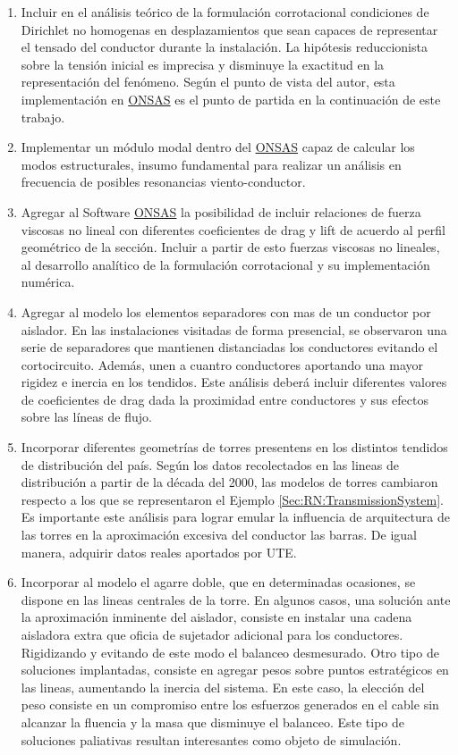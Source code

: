 \begin{enumerate}
	\item Incluir en el análisis teórico de la formulación corrotacional condiciones de Dirichlet no homogenas en desplazamientos que sean capaces de  representar el tensado del conductor durante la instalación. La hipótesis reduccionista sobre la tensión inicial es imprecisa y disminuye la exactitud en la representación del fenómeno. Según el punto de vista del autor, esta implementación en \href{https://github.com/ONSAS/ONSAS/}{ONSAS} es el punto de partida en la continuación de este trabajo. 
	\item Implementar un módulo modal dentro del \href{https://github.com/ONSAS/ONSAS/}{ONSAS} capaz de calcular los modos estructurales, insumo fundamental para realizar un análisis en frecuencia de posibles resonancias viento-conductor.
	\item Agregar al Software  \href{https://github.com/ONSAS/ONSAS/}{ONSAS} la posibilidad de incluir relaciones de fuerza viscosas no lineal con diferentes coeficientes de drag y lift de acuerdo al perfil geométrico de la sección. Incluir a partir de esto fuerzas viscosas no lineales, al desarrollo analítico de la formulación corrotacional y su implementación numérica. 
	\item Agregar al modelo los elementos separadores con mas de un conductor por aislador. En las instalaciones visitadas de forma presencial, se observaron una serie de separadores que mantienen distanciadas los conductores evitando el cortocircuito. Además, unen a cuantro conductores aportando una mayor rigidez e inercia en los tendidos. Este análisis deberá incluir diferentes valores de coeficientes de drag dada la proximidad entre conductores y sus efectos sobre las líneas de flujo.  
	\item Incorporar diferentes geometrías de torres presentens en los distintos tendidos de distribución del país. Según los datos recolectados en las lineas de distribución a partir de la década del 2000, las modelos de torres cambiaron respecto a los que se representaron el Ejemplo \ref{Sec:RN:TransmissionSystem}. Es importante este análisis para lograr emular la influencia de arquitectura de las torres en la aproximación excesiva del conductor las barras. De igual manera, adquirir datos reales aportados por UTE.
	\item Incorporar al modelo el agarre doble, que en determinadas ocasiones, se dispone en las lineas centrales de la torre. En algunos casos, una solución ante la aproximación inminente del aislador, consiste en instalar una cadena aisladora extra que oficia de sujetador adicional para los conductores. Rigidizando y evitando de este modo el balanceo desmesurado. Otro tipo de soluciones implantadas, consiste en agregar pesos sobre puntos estratégicos en las lineas, aumentando la inercia del sistema. En este caso, la elección del peso consiste en un compromiso entre los esfuerzos generados en el cable sin alcanzar la fluencia y la masa que disminuye el balanceo. Este tipo de soluciones paliativas resultan interesantes como objeto de simulación.	

\end{enumerate}
